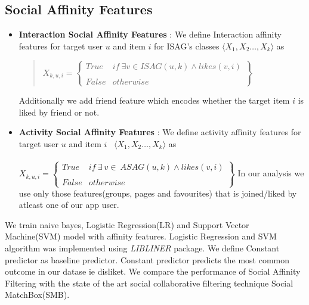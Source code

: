 \subsection{Social Affinity Features}
\begin{itemize}
  \item \textbf{Interaction Social Affinity Features} : We define Interaction affinity features for target user $u$ and item $i$ for ISAG's classes 
  $ \langle X_{1},X_{2}\ldots,X_{k}\rangle$ as
  \begin{quote}
  \begin{math}
   X_{k,u,i} = \begin{Bmatrix}
   		True & if\ \exists v\in ISAG(u,k) \wedge likes(v,i)\\ \\
   		False & otherwise
   \end{Bmatrix}
  \end{math}
  \end{quote}
  Additionally we add friend feature which encodes whether the target item $i$ is liked by friend or not.
  \item \textbf{Activity Social Affinity Features} : We define activity affinity features for target user $u$ and item $i$   \
  $ \langle X_{1},X_{2}\ldots,X_{k}\rangle$ as\\ \\
  \begin{math}
   X_{k,u,i} = \begin{Bmatrix}
   		True & if\ \exists\ v\in \ ASAG(u,k) \wedge likes(v,i)\\ \\
   		False & otherwise
   \end{Bmatrix}
  \end{math}
	In our analysis we use only those features(groups, pages and favourites) that is joined/liked by atleast one of our app user.
\end{itemize}

We train naive bayes, Logistic Regression(LR) and Support Vector Machine(SVM) model with affinity features.
Logistic Regression and SVM algorithm was implemented using \textit{LIBLINER} \cite{liblinear} package. 
We define Constant predictor as baseline predictor. Constant predictor predicts the most common outcome in our datase ie disliket.
We compare the performance of Social Affinity Filtering with the state of the art social collaborative filtering technique 
Social MatchBox(SMB)\cite{SMB}.

